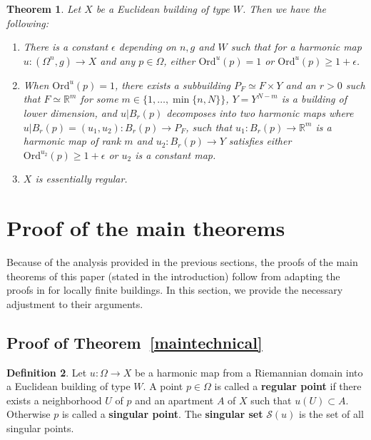\documentclass[12pt]{amsart}
\newtheorem{theorem}{Theorem}[section]
\theoremstyle{definition}
\newtheorem{definition}[theorem]{Definition}
\numberwithin{equation}{section}
\newcommand{\R}{\mathbb R}
\newcommand{\PF}{P_F}
\newcommand{\FY}{F \times Y}
\begin{document}
\begin{theorem}\label{thm:ordgap}
Let $X$ be a Euclidean building of type $W$.  Then we have the following:
\begin{enumerate}
\item There is a constant $\epsilon$ depending on $n,g$ and $W$ 
such that for a harmonic map $u:(\Omega^n,g)\to X$ and any $p\in\Omega$, either $\text{Ord}^u(p)=1$ or $\text{Ord}^u(p)\geq1+\epsilon$.
\item When $\text{Ord}^u(p)=1$, there exists a subbuilding $\PF\simeq \FY$ and an $r >0$ such that $F\simeq\R^m$ for some $m \in \{1, \dots, \min\{n,N\}\}$, $Y=Y^{N-m}$ is a building of lower dimension, and $u|B_r(p)$ decomposes into two harmonic maps where $u|{B_r(p)}=(u_1,u_2):B_r(p)\to \PF$, such that $u_1:B_r(p) \to \R^m$ is a harmonic map of rank $m$ and $u_2:B_r(p) \to Y$ satisfies either $\text{Ord}^{u_2}(p)\geq 1+\epsilon$ or $u_2$ is a constant map.
\item $X$ is essentially regular. 
\end{enumerate}
\end{theorem}



\section{Proof of the main theorems}
\label{sec:proofsofrigdity}

Because of the analysis provided in the previous sections, the proofs of the main theorems of this paper (stated in the introduction) follow from adapting the proofs in \cite{gromov-schoen} for locally finite buildings. In this section, we provide the necessary adjustment to their arguments.


\subsection{Proof of Theorem~\ref{maintechnical}}
\begin{definition}\label{def:singular}
Let $u: \Omega \rightarrow X$  be a harmonic map from a Riemannian domain into a Euclidean building of type $W$.  A point $p \in \Omega$ is called a {\bf regular point} if there exists a neighborhood $U$ of $p$ and an apartment $A$ of $X$ such that $u(U) \subset A$.  Otherwise $p$ is called a {\bf singular point}.  The {\bf singular set} $\mathcal S(u)$  is  the set of all singular points.  
\end{definition}
\end{document}
